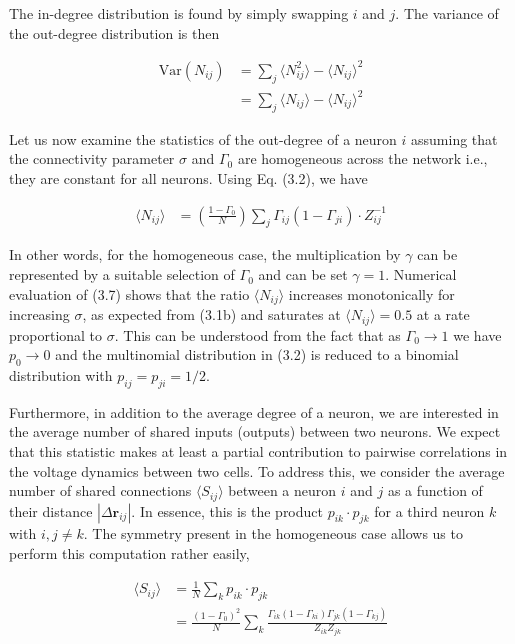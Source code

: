 \documentclass{ucetd}
\begin{document}
The in-degree distribution is found by simply swapping $i$ and $j$. The variance of the out-degree distribution is then

\begin{align}
\mathrm{Var}(N_{ij}) &= \sum_{j} \langle N_{ij}^{2} \rangle - \langle N_{ij} \rangle ^{2} \\
&= \sum_{j} \langle N_{ij}\rangle - \langle N_{ij} \rangle ^{2} 
\end{align}

Let us now examine the statistics of the out-degree of a neuron $i$ assuming that the connectivity parameter $\sigma$ and $\Gamma_{0}$ are homogeneous across the network i.e., they are constant for all neurons. Using Eq. (3.2), we have

\begin{align}
\langle N_{ij} \rangle &= \left(\frac{1-\Gamma_{0}}{N}\right)\sum_{j} \Gamma_{ij}(1-\Gamma_{ji})\cdot Z_{ij}^{-1}
\end{align}

In other words, for the homogeneous case, the multiplication by $\gamma$ can be represented by a suitable selection of $\Gamma_{0}$ and can be set $\gamma=1$. Numerical evaluation of (3.7) shows that the ratio $\langle N_{ij}\rangle$ increases monotonically for increasing $\sigma$, as expected from (3.1b) and saturates at $\langle N_{ij}\rangle = 0.5$ at a rate proportional to $\sigma$. This can be understood from the fact that as $\Gamma_{0} \rightarrow 1$ we have $p_{0} \rightarrow 0$ and the multinomial distribution in (3.2) is reduced to a binomial distribution with $p_{ij} = p_{ji} = 1/2$. 

Furthermore, in addition to the average degree of a neuron, we are interested in the average number of shared inputs (outputs) between two neurons. We expect that this statistic makes at least a partial contribution to pairwise correlations in the voltage dynamics between two cells. To address this, we consider the average number of shared connections $\langle S_{ij} \rangle$ between a neuron $i$ and $j$ as a function of their distance $|\Delta \mathbf{r}_{ij}|$. In essence, this is the product $p_{ik}\cdot p_{jk}$ for a third neuron $k$ with $i,j\neq k$. The symmetry present in the homogeneous case allows us to perform this computation rather easily,

\begin{align}
\langle S_{ij} \rangle &= \frac{1}{N}\sum_{k} p_{ik}\cdot p_{jk} \\
&= \frac{\left(1-\Gamma_{0}\right)^{2}}{N}\sum_{k}\frac{\Gamma_{ik}(1-\Gamma_{ki})\Gamma_{jk}(1-\Gamma_{kj})}{Z_{ik}Z_{jk}}
\end{align}
\end{document}
